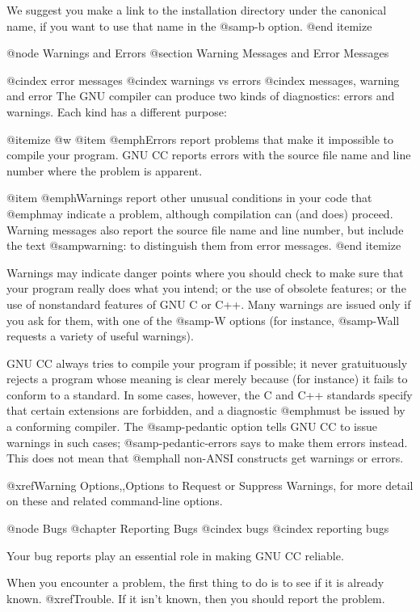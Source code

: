 We suggest you make a link to the installation directory under the
canonical name, if you want to use that name in the @samp{-b} option.
@end itemize

@node Warnings and Errors
@section Warning Messages and Error Messages

@cindex error messages
@cindex warnings vs errors
@cindex messages, warning and error
The GNU compiler can produce two kinds of diagnostics: errors and
warnings.  Each kind has a different purpose:

@itemize @w{}
@item 
@emph{Errors} report problems that make it impossible to compile your
program.  GNU CC reports errors with the source file name and line
number where the problem is apparent.

@item
@emph{Warnings} report other unusual conditions in your code that
@emph{may} indicate a problem, although compilation can (and does)
proceed.  Warning messages also report the source file name and line
number, but include the text @samp{warning:} to distinguish them
from error messages.
@end itemize

Warnings may indicate danger points where you should check to make sure
that your program really does what you intend; or the use of obsolete
features; or the use of nonstandard features of GNU C or C++.  Many
warnings are issued only if you ask for them, with one of the @samp{-W}
options (for instance, @samp{-Wall} requests a variety of useful
warnings).

GNU CC always tries to compile your program if possible; it never
gratuituously rejects a program whose meaning is clear merely because
(for instance) it fails to conform to a standard.  In some cases,
however, the C and C++ standards specify that certain extensions are
forbidden, and a diagnostic @emph{must} be issued by a conforming
compiler.  The @samp{-pedantic} option tells GNU CC to issue warnings in
such cases; @samp{-pedantic-errors} says to make them errors instead.
This does not mean that @emph{all} non-ANSI constructs get warnings
or errors.

@xref{Warning Options,,Options to Request or Suppress Warnings}, for
more detail on these and related command-line options.

@node Bugs
@chapter Reporting Bugs
@cindex bugs
@cindex reporting bugs

Your bug reports play an essential role in making GNU CC reliable.

When you encounter a problem, the first thing to do is to see if it is
already known.  @xref{Trouble}.  If it isn't known, then you should
report the problem.

